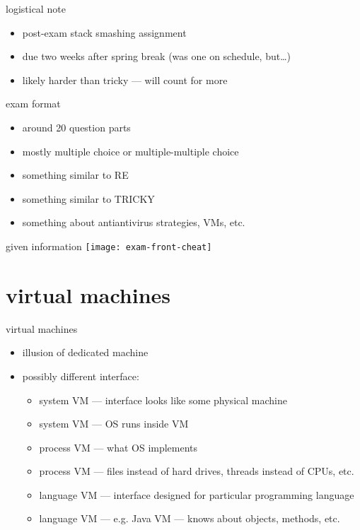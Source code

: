 \begin{frame}
    \titlepage
\end{frame}

\begin{frame}{logistical note}
    \begin{itemize}
    \item post-exam stack smashing assignment
    \item due two weeks after spring break (was one on schedule, but\ldots)
    \item likely harder than tricky --- will count for more
    \end{itemize}
\end{frame}

\begin{frame}{exam format}
    \begin{itemize}
    \item around 20 question parts
    \item mostly multiple choice or multiple-multiple choice
    \item something similar to RE
    \item something similar to TRICKY
    \item something about antiantivirus strategies, VMs, etc.
    \end{itemize}
\end{frame}

\begin{frame}{given information}
    \texttt{[image: exam-front-cheat]}
\end{frame}


\section{virtual machines}

\begin{frame}{virtual machines}
    \begin{itemize}
    \item illusion of dedicated machine
    \item possibly different interface:
        \begin{itemize}
        \item system VM --- interface looks like some physical machine
        \item system VM --- OS runs inside VM
        \item process VM --- what OS implements
        \item process VM --- files instead of hard drives, threads instead of CPUs, etc.
        \item language VM --- interface designed for particular programming language
        \item language VM --- e.g. Java VM --- knows about objects, methods, etc.
        \end{itemize}
    \end{itemize}
\end{frame}

